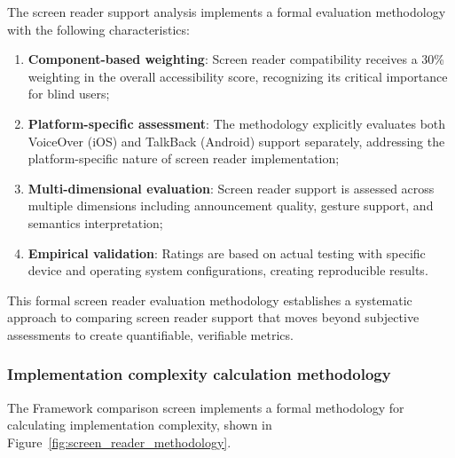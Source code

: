 The screen reader support analysis implements a formal evaluation methodology with the following characteristics:

\begin{enumerate}
    \item \textbf{Component-based weighting}: Screen reader compatibility receives a 30\% weighting in the overall accessibility score, recognizing its critical importance for blind users;
    
    \item \textbf{Platform-specific assessment}: The methodology explicitly evaluates both VoiceOver (iOS) and TalkBack (Android) support separately, addressing the platform-specific nature of screen reader implementation;
    
    \item \textbf{Multi-dimensional evaluation}: Screen reader support is assessed across multiple dimensions including announcement quality, gesture support, and semantics interpretation;
    
    \item \textbf{Empirical validation}: Ratings are based on actual testing with specific device and operating system configurations, creating reproducible results.
\end{enumerate}

This formal screen reader evaluation methodology establishes a systematic approach to comparing screen reader support that moves beyond subjective assessments to create quantifiable, verifiable metrics.

\subsubsection{Implementation complexity calculation methodology}

The Framework comparison screen implements a formal methodology for calculating implementation complexity, shown in Figure~\ref{fig:screen_reader_methodology}.

